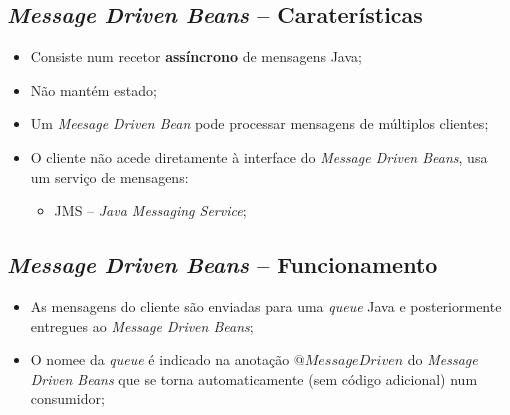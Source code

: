 \documentclass{article}
\begin{document}
\subsection{\textit{Message Driven Beans} -- Caraterísticas}

\begin{itemize}
	\item Consiste num recetor \textbf{assíncrono} de mensagens Java;
	\item Não mantém estado;
	\item Um \textit{Meesage Driven Bean} pode processar mensagens de múltiplos clientes;
	\item O cliente não acede diretamente à interface do \textit{Message Driven Beans}, usa um serviço de mensagens:
		\begin{itemize}
			\item JMS -- \textit{Java Messaging Service};
		\end{itemize}
\end{itemize} 

\subsection{\textit{Message Driven Beans} -- Funcionamento}

\begin{itemize}
	\item As mensagens do cliente são enviadas para uma \textit{queue} Java e posteriormente entregues ao \textit{Message Driven Beans};
	\item O nomee da \textit{queue} é indicado na anotação $@MessageDriven$ do \textit{Message Driven Beans} que se torna automaticamente (sem código adicional) num consumidor;
\end{itemize}
\end{document}
